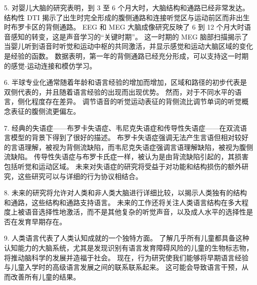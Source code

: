 5. 对婴儿大脑的研究表明，到 3 至 6 个月大时，大脑结构和通路已经非常发达。 结构性 DTI 揭示了出生时完全形成的腹侧通路和连接听觉区与运动前区而非出生时布罗卡区的背侧通路。 EEG 和 MEG 大脑成像研究反映了 6 到 12 个月大时语音感知的转变，这是声音学习的“关键时期”。 这一时期的 MEG 脑部扫描揭示了当婴儿听到语音时听觉和运动中枢的共同激活，并显示感觉和运动大脑区域的变化是经验的函数。 数据表明，第一年的背侧通路已经充分形成，可以支持这一时期的感觉-运动连接和模仿学习。

6. 半球专业化通常随着年龄和语言经验的增加而增加，区域和路径的初步代表是双侧代表的，并且随着语言经验的出现而出现优势。 然而，对于不同水平的语言，侧化程度存在差异。 调节语音的听觉运动表征的背侧流比调节单词的听觉概念表征的腹侧流更偏左。 

7. 经典的失语症——布罗卡失语症、韦尼克失语症和传导性失语症——在双流语言模型的背景下得到了很好的描述。 布罗卡失语症强调无法产生言语但相对较好的言语理解，被视为背侧流缺陷，而韦尼克失语症强调言语理解缺陷，被视为腹侧流缺陷。 传导性失语症与布罗卡氏症一样，被认为是由背流缺陷引起的，其损害包括听觉和运动区域。 未来对失语症的研究将受益于对功能和结构损伤的额外研究，这些研究可以与详细的行为协议相结合。 

8. 未来的研究将允许对人类和非人类大脑进行详细比较，以揭示人类独有的结构和通路，这些结构和通路支持语言。 未来的工作还将关注人类语言结构在多大程度上被语音选择性地激活，而不是其他复杂的听觉声音，以及成人水平的选择性是否在发育早期存在。 

9. 人类语言代表了人类认知成就的一个独特方面。 了解几乎所有儿童都具备这种认知能力的大脑系统，尤其是发现识别有语言发育障碍风险的儿童的生物标志物，将推动脑科学的发展并造福于社会。 现在，行为研究使我们能够将早期语言经验与儿童入学时的高级语言发展之间的联系联系起来。 这可能会导致语言干预，从而改善所有儿童的结果。



